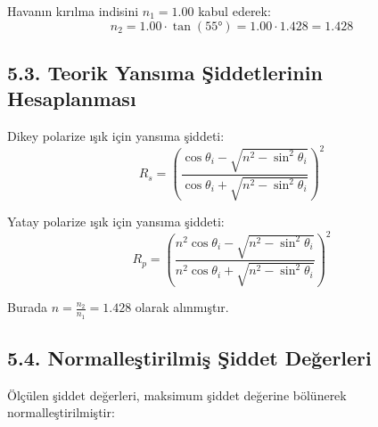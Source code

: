 \documentclass[11pt,letterpaper,twocolumn]{fenbil}
\begin{document}
Havanın kırılma indisini \( n_1 = 1.00 \) kabul ederek:
\[
n_2 = 1.00 \cdot \tan(55°) = 1.00 \cdot 1.428 = 1.428
\]

\subsection*{5.3. Teorik Yansıma Şiddetlerinin Hesaplanması}
Dikey polarize ışık için yansıma şiddeti:
\[
R_s = \left(\frac{\cos{\theta_i} - \sqrt{n^2 - \sin^2{\theta_i}}}{\cos{\theta_i} + \sqrt{n^2 - \sin^2{\theta_i}}}\right)^2
\]

Yatay polarize ışık için yansıma şiddeti:
\[
R_p = \left(\frac{n^2\cos{\theta_i} - \sqrt{n^2 - \sin^2{\theta_i}}}{n^2\cos{\theta_i} + \sqrt{n^2 - \sin^2{\theta_i}}}\right)^2
\]

Burada \( n = \frac{n_2}{n_1} = 1.428 \) olarak alınmıştır.

\subsection*{5.4. Normalleştirilmiş Şiddet Değerleri}
Ölçülen şiddet değerleri, maksimum şiddet değerine bölünerek normalleştirilmiştir:

\begin{table}[H]
    \begin{center}
    \end{center}
    \caption{Normalleştirilmiş şiddet değerleri ve teorik hesaplamalar.}
\end{table}
\end{document}

